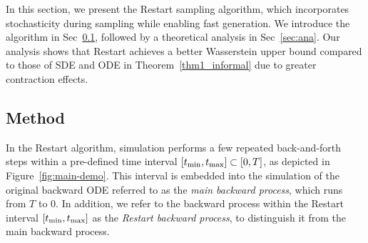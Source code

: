 \label{sec:method}
In this section, we present the Restart sampling algorithm, which incorporates stochasticity during sampling while enabling fast generation. We introduce the algorithm in Sec~\ref{sec:restart-method}, followed by a theoretical analysis in Sec~\ref{sec:ana}. Our analysis shows that Restart achieves a better Wasserstein upper bound compared to those of SDE and ODE in Theorem~\ref{thm1_informal} due to greater contraction effects. %

\subsection{Method}
\label{sec:restart-method}

In the Restart algorithm, simulation performs a few repeated back-and-forth steps within a pre-defined time interval $[t_{\textrm{min}},t_{\textrm{max}}] \subset [0,T]$, as depicted in Figure~\ref{fig:main-demo}. This interval is embedded into the simulation of the original backward ODE referred to as the \textit{main backward process}, which runs from $T$ to $0$. In addition, we refer to the backward process within the Restart interval $[t_{\textrm{min}},t_{\textrm{max}}]$ as the \textit{Restart backward process}, to distinguish it from the main backward process.

